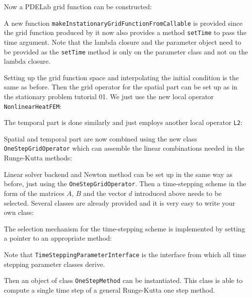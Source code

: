 \documentclass[a4paper,12pt]{article}
\begin{document}
Now a PDELab grid function can be constructed:

A new function \lstinline{makeInstationaryGridFunctionFromCallable}
is provided since the grid function produced by it now also
provides a method \lstinline{setTime} to pass the time argument.
Note that the lambda closure and the parameter object need to be
provided as the \lstinline{setTime} method is only on the parameter class
and not on the lambda closure.

Setting up the grid function space and interpolating the initial condition
is the same as before. Then the grid operator for the spatial part can be
set up as in the stationary problem tutorial 01. We just use the new
local operator \lstinline{NonlinearHeatFEM}:


The temporal part is done similarly and just employs another local operator
\lstinline{L2}:


Spatial and temporal part are now combined using the
new class \lstinline{OneStepGridOperator} which can assemble
the linear combinations needed in the Runge-Kutta methods:


Linear solver backend and Newton method can be set up
in the same way as before, just using the \lstinline{OneStepGridOperator}.
Then a time-stepping scheme in the form of
the matrices $A$, $B$ and the vector $d$ introduced above needs to be selected.
Several classes are already provided and it is very easy to write your own class:


The selection mechanism for the time-stepping scheme
is implemented by setting a pointer to an appropriate method:

Note that \lstinline{TimeSteppingParameterInterface} is the interface from
which all time stepping parameter classes derive.

Then an object of class \lstinline{OneStepMethod} can be instantiated.
This class is able to compute a single time step of a general
Runge-Kutta one step method.

\end{document}
